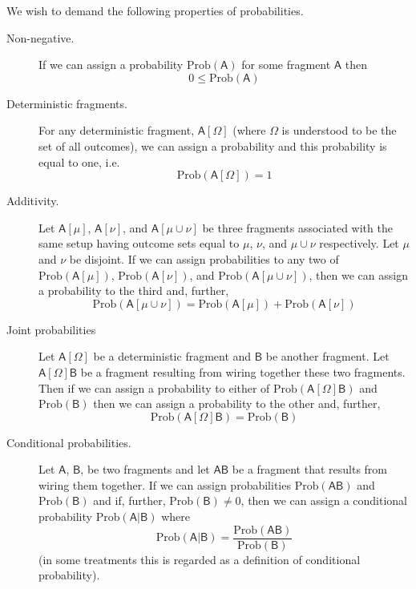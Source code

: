 \documentclass[10pt]{article}
\begin{document}
We wish to demand the following  properties of probabilities.
\begin{description}
\item[Non-negative.]  If we can assign a probability $\text{Prob}(\mathsf{A})$  for some fragment $\mathsf{A}$ then
    \begin{equation}\label{probpropgeqzero}
    0\leq \text{Prob}(\mathsf{A})
    \end{equation}
\item[Deterministic fragments.]  For any deterministic fragment, $\mathsf{A}[\Omega]$ (where $\Omega$ is understood to be the set of all outcomes), we can assign a probability and this probability is equal to one, i.e.\
    \begin{equation}\label{probonefordetfrag}
    \text{Prob}(\mathsf{A}[\Omega]) =1
    \end{equation}
\item[Additivity.]  Let $\mathsf{A}[\mu]$, $\mathsf{A}[\nu]$, and $\mathsf{A}[\mu\cup\nu]$ be three fragments associated with the same setup having outcome sets equal to $\mu$, $\nu$, and $\mu\cup\nu$ respectively. Let $\mu$ and $\nu$ be disjoint.   If we can assign probabilities to any two of $\text{Prob}(\mathsf{A}[\mu])$, $\text{Prob}(\mathsf{A}[\nu])$, and  $\text{Prob}(\mathsf{A}[\mu\cup \nu])$, then we can assign a probability to the third and, further,
    \begin{equation}\label{additivityofprobs}
    \text{Prob}(\mathsf{A}[\mu\cup\nu ])
    = \text{Prob}(\mathsf{A}[\mu]) + \text{Prob}(\mathsf{A}[\nu])
    \end{equation}
\item[Joint probabilities] Let $\mathsf{A}[\Omega]$ be a deterministic fragment and $\mathsf B$ be another fragment. Let $\mathsf{A}[\Omega]\mathsf{B}$ be a fragment resulting from wiring together these two fragments.  Then if we can assign a probability to either of $\text{Prob}(\mathsf{A}[\Omega]\mathsf{B})$ and $\text{Prob}(\mathsf{B})$ then we can assign a probability to the other and, further,
    \begin{equation}\label{jointprobproperty}
    \text{Prob}(\mathsf{A}[\Omega]\mathsf{B}) = \text{Prob}(\mathsf{B})
    \end{equation}
\item[Conditional probabilities.]  Let $\mathsf{A}$, $\mathsf{B}$, be two fragments and let $\mathsf{AB}$ be a fragment that results from wiring them together.  If we can assign probabilities $\text{Prob}(\mathsf{AB})$ and $\text{Prob}(\mathsf{B})$ and if, further, $\text{Prob}(\mathsf{B})\not=0$, then we can assign a conditional probability $\text{Prob}(\mathsf{A|B})$ where
    \begin{equation}\label{condprobgeneral}
    \text{Prob}(\mathsf{A|B})=\frac{\text{Prob}(\mathsf{AB})}{\text{Prob}(\mathsf{B})}
    \end{equation}
    (in some treatments this is regarded as a definition of conditional probability).
\end{description}
\end{document}
